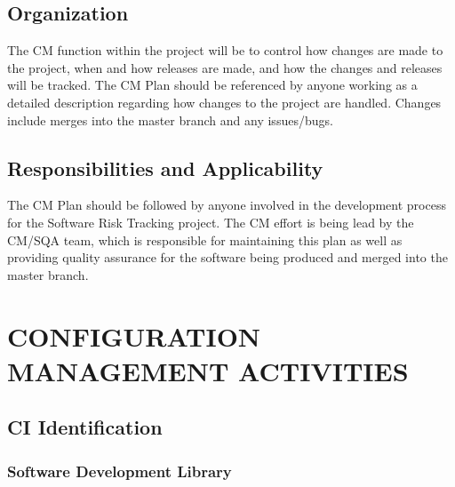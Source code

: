 \documentclass[letterpaper,12pt,oneside,listof=totoc]{scrreprt}
\begin{document}
\section{Organization}

The CM function within the project will be to control how changes are made to the project, when and how releases are made, and how the changes and releases will be tracked. The CM Plan should be referenced by anyone working as a detailed description regarding how changes to the project are handled. Changes include merges into the master branch and any issues/bugs. 

\section{Responsibilities and Applicability}

The CM Plan should be followed by anyone involved in the development process for the Software Risk Tracking project. The CM effort is being lead by the CM/SQA team, which is responsible for maintaining this plan as well as providing quality assurance for the software being produced and merged into the master branch. 

\chapter{CONFIGURATION MANAGEMENT ACTIVITIES}


\section{CI Identification}




\subsection{Software Development Library}
\end{document}
